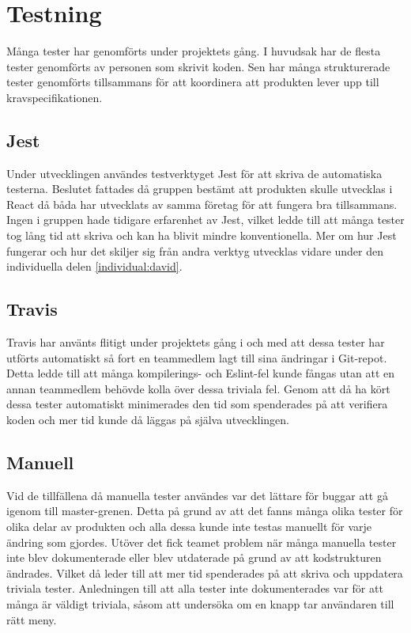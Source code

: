 \section{Testning}
Många tester har genomförts under projektets gång. I huvudsak har de flesta tester genomförts av personen som skrivit koden. Sen har många strukturerade tester genomförts tillsammans för att koordinera att produkten lever upp till kravspecifikationen. 

\subsection{Jest}
Under utvecklingen användes testverktyget Jest för att skriva de automatiska testerna. Beslutet fattades då gruppen bestämt att produkten skulle utvecklas i React då båda har utvecklats av samma företag för att fungera bra tillsammans. Ingen i gruppen hade tidigare erfarenhet av Jest, vilket ledde till att många tester tog lång tid att skriva och kan ha blivit mindre konventionella. Mer om hur Jest fungerar och hur det skiljer sig från andra verktyg utvecklas vidare under den individuella delen \ref{individual:david}.

\subsection{Travis}
Travis har använts flitigt under projektets gång i och med att dessa tester har utförts automatiskt så fort en teammedlem lagt till sina ändringar i Git-repot. Detta ledde till att många kompilerings- och Eslint-fel kunde fångas utan att en annan teammedlem behövde kolla över dessa triviala fel. Genom att då ha kört dessa tester automatiskt minimerades den tid som spenderades på att verifiera koden och mer tid kunde då läggas på själva utvecklingen. 

\subsection{Manuell}
Vid de tillfällena då manuella tester användes var det lättare för buggar att gå igenom till master-grenen. Detta på grund av att det fanns många olika tester för olika delar av produkten och alla dessa kunde inte testas manuellt för varje ändring som gjordes. Utöver det fick teamet problem när många manuella tester inte blev dokumenterade eller blev utdaterade på grund av att kodstrukturen ändrades. Vilket då leder till att mer tid spenderades på att skriva och uppdatera triviala tester. Anledningen till att alla tester inte dokumenterades var för att många är väldigt triviala, såsom att undersöka om en knapp tar användaren till rätt meny. 
